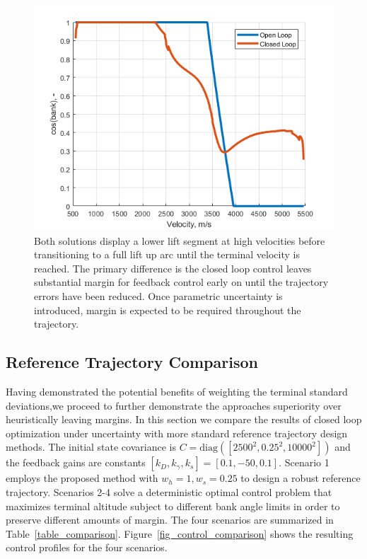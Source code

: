 \documentclass[letterpaper, paper,11pt]{AAS}
\newcommand{\cov}{C}
\begin{document}
\begin{figure}[h!]
	\centering
	\includegraphics[width=1\textwidth]{ddp/control}
	\caption{Both solutions display a lower lift segment at high velocities before transitioning to a full lift up arc until the terminal velocity is reached. The primary difference is the closed loop control leaves substantial margin for feedback control early on until the trajectory errors have been reduced. Once parametric uncertainty is introduced, margin is expected to be required throughout the trajectory.}
\end{figure}

\subsection{Reference Trajectory Comparison}
Having demonstrated the potential benefits of weighting the terminal standard deviations,we proceed to further demonstrate the approaches superiority over heuristically leaving margins.
In this section we compare the results of closed loop optimization under uncertainty with more standard reference trajectory design methods. The initial state covariance is $\cov = \mathrm{diag}([2500^2,0.25^2,10000^2])$ and the feedback gains are constants $[k_D,k_{\gamma},k_s] = [0.1, -50, 0.1]$. Scenario 1 employs the proposed method with $w_h=1, w_s=0.25$ to design a robust reference trajectory. Scenarios 2-4 solve a deterministic optimal control problem that maximizes terminal altitude subject to different bank angle limits in order to preserve different amounts of margin. The four scenarios are summarized in Table~\ref{table_comparison}. Figure~\ref{fig_control_comparison} shows the resulting control profiles for the four scenarios.
\end{document}
